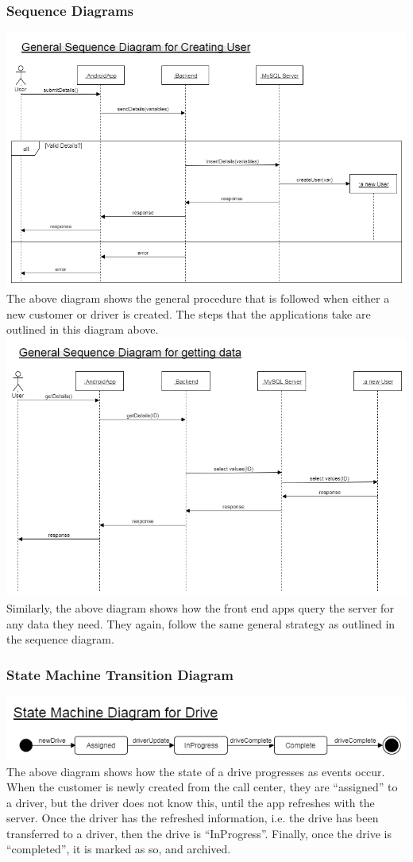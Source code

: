 \documentclass[a4paper,12pt]{article}
\begin{document}
\subsubsection{Sequence Diagrams}
\includegraphics[scale=0.5]{CreateSequenceDiagram}
The above diagram shows the general procedure that is followed when either a new customer or driver is created. The steps that the applications take are outlined in this diagram above.\\
\includegraphics[scale=0.5]{GetDataSequenceDiagram}
Similarly, the above diagram shows how the front end apps query the server for any data they need. They again, follow the same general strategy as outlined in the sequence diagram.

\subsubsection{State Machine Transition Diagram}
\includegraphics[scale=0.5]{statemachinediagram}
\\The above diagram shows how the state of a drive progresses as events occur. When the customer is newly created from the call center, they are ``assigned'' to a driver, but the driver does not know this, until the app refreshes with the server. Once the driver has the refreshed information, i.e. the drive has been transferred to a driver, then the drive is ``InProgress''. Finally, once the drive is ``completed'', it is marked as so, and archived.
\newpage
\end{document}
